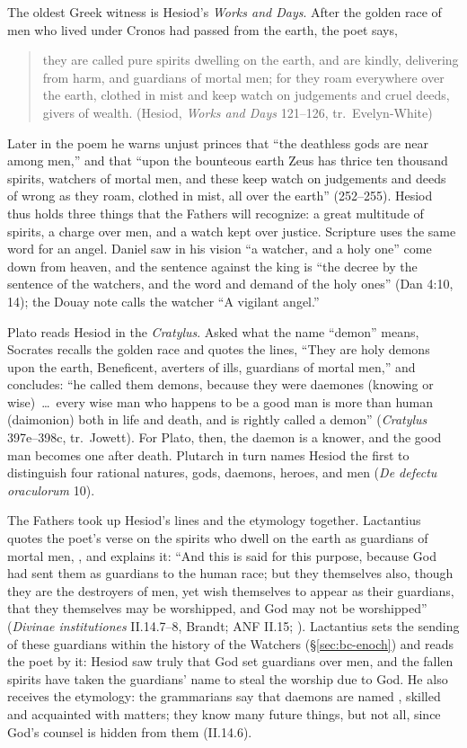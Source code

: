 The oldest Greek witness is Hesiod's \emph{Works and Days}. After the
golden race of men who lived under Cronos had passed from the earth,
the poet says,
\begin{quote}
they are called pure spirits dwelling on the earth, and are kindly,
delivering from harm, and guardians of mortal men; for they roam
everywhere over the earth, clothed in mist and keep watch on judgements
and cruel deeds, givers of wealth. (Hesiod, \emph{Works and Days}
121--126, tr.\ Evelyn-White)
\end{quote}
Later in the poem he warns unjust princes that ``the deathless gods are
near among men,'' and that ``upon the bounteous earth Zeus has thrice
ten thousand spirits, watchers of mortal men, and these keep watch on
judgements and deeds of wrong as they roam, clothed in mist, all over
the earth'' (252--255). Hesiod thus holds three things that the Fathers
will recognize: a great multitude of spirits, a charge over men, and a
watch kept over justice. Scripture uses the same word for an angel.
Daniel saw in his vision ``a watcher, and a holy one'' come down from
heaven, and the sentence against the king is ``the decree by the
sentence of the watchers, and the word and demand of the holy ones''
(Dan 4:10, 14); the Douay note calls the watcher ``A vigilant angel.''

Plato reads Hesiod in the \emph{Cratylus}. Asked what the name
``demon'' means, Socrates recalls the golden race and quotes the lines,
``They are holy demons upon the earth, Beneficent, averters of ills,
guardians of mortal men,'' and concludes: ``he called them demons,
because they were daemones (knowing or wise)~\dots\ every wise man who
happens to be a good man is more than human (daimonion) both in life and
death, and is rightly called a demon'' (\emph{Cratylus} 397e--398c,
tr.\ Jowett). For Plato, then, the daemon is a knower, and the good man
becomes one after death. Plutarch in turn names Hesiod the first to
distinguish four rational natures, gods, daemons, heroes, and men
(\emph{De defectu oraculorum} 10).

The Fathers took up Hesiod's lines and the etymology together.
Lactantius quotes the poet's verse on the spirits who dwell on the
earth as guardians of mortal men, , and
explains it: ``And this is said for this purpose, because God had sent them as guardians
to the human race; but they themselves also, though they are the
destroyers of men, yet wish themselves to appear as their guardians,
that they themselves may be worshipped, and God may not be worshipped''
(\emph{Divinae institutiones} II.14.7--8, Brandt; ANF II.15;
). Lactantius sets the
sending of these guardians within the history of the Watchers
(\S\ref{sec:bc-enoch}) and reads the poet by it: Hesiod saw truly
that God set guardians over men, and the fallen spirits have taken the
guardians' name to steal the worship due to God. He also receives the
etymology: the grammarians say that daemons are named 
, skilled and
acquainted with matters; they know many future things, but not all,
since God's counsel is hidden from them (II.14.6).

